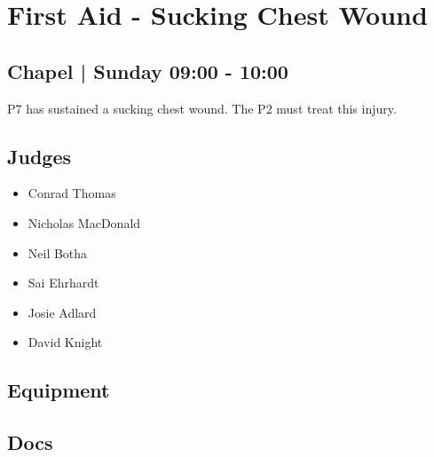 \documentclass[10pt]{article}
\begin{document}
		\begin{minipage}{\linewidth}
		\setcounter{section}{32}
	\section{First Aid - Sucking Chest Wound }
	\subsection*{Chapel | Sunday 09:00 - 10:00}

	P7 has sustained a sucking chest wound. The P2 must treat this injury. 

	\begin{multicols}{2}
	\subsection*{\faUsers \: Judges}
	\begin{itemize}
			\item Conrad Thomas
			\item Nicholas MacDonald
			\item Neil Botha
			\item Sai Ehrhardt
			\item Josie Adlard
			\item David Knight
		\end{itemize}
	\columnbreak
	\subsection*{\faWrench \: Equipment}
	        \vfill\null
        \subsection*{\faFile \: Docs}
     	\end{multicols}


	\vspace{1cm}
	\end{minipage}
\end{document}

